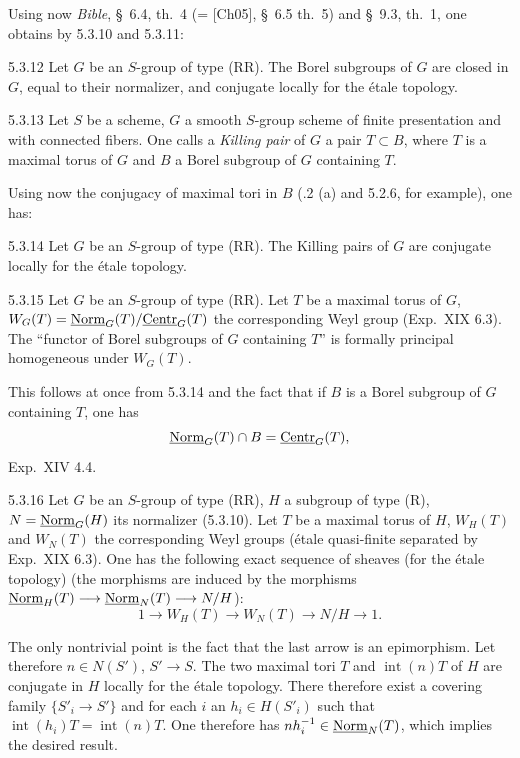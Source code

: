 Using now \textit{Bible}, \S~6.4, th.~4 (= [Ch05], \S~6.5 th.~5) and \S~9.3, th.~1, one obtains by 5.3.10 and 5.3.11:
\begin{corollary}{5.3.12}\label{XXII.5.3.12}
Let $G$ be an $S$-group of type (RR). The Borel subgroups of $G$ are closed in $G$, equal to their normalizer, and conjugate locally for the \'etale topology.
\end{corollary}
\begin{definition}{5.3.13}\label{XXII.5.3.13}
Let $S$ be a scheme, $G$ a smooth $S$-group scheme of finite presentation and with connected fibers.{\renewcommand{\thefootnote}{(34)}} One calls a \emph{Killing pair} of $G$ a pair $T\subset B$, where $T$ is a maximal torus of $G$ and $B$ a Borel subgroup of $G$ containing $T$.
\end{definition}
Using now the conjugacy of maximal tori in $B$ (.2 (a) and 5.2.6, for example), one has:
\begin{corollary}{5.3.14}\label{XXII.5.3.14}
Let $G$ be an $S$-group of type (RR). The Killing pairs of $G$ are conjugate locally for the \'etale topology.
\end{corollary}
\begin{corollary}{5.3.15}\label{XXII.5.3.15}
Let $G$ be an $S$-group of type (RR). Let $T$ be a maximal torus of $G$, $W_G(T)=\underline{\mathrm{Norm}}_G(T)/\underline{\mathrm{Centr}}_G(T)$ the corresponding Weyl group (Exp.~XIX 6.3). The ``functor of Borel subgroups of $G$ containing $T$'' is formally principal homogeneous under $W_G(T)$.
\end{corollary}
This follows at once from 5.3.14 and the fact that if $B$ is a Borel subgroup of $G$ containing $T$, one has
\[
\underline{\mathrm{Norm}}_G(T)\cap B=\underline{\mathrm{Centr}}_G(T),
\]
\cf Exp.~XIV 4.4.
\begin{proposition}{5.3.16}\label{XXII.5.3.16}
Let $G$ be an $S$-group of type (RR), $H$ a subgroup of type (R), $N=\underline{\mathrm{Norm}}_G(H)$ its normalizer (5.3.10). Let $T$ be a maximal torus of $H$, $W_H(T)$ and $W_N(T)$ the corresponding Weyl groups (\'etale quasi-finite separated by Exp.~XIX 6.3). One has the following exact sequence of sheaves (for the \'etale topology) (the morphisms are induced by the morphisms $\underline{\mathrm{Norm}}_H(T)\longrightarrow\underline{\mathrm{Norm}}_N(T)\longrightarrow N/H$):
\[
1\to W_H(T)\to W_N(T)\to N/H\to1.
\]
\end{proposition}
The only nontrivial point is the fact that the last arrow is an epimorphism. Let therefore $n\in N(S')$, $S'\to S$. The two maximal tori $T$ and $\operatorname{int}(n)T$ of $H$ are conjugate in $H$ locally for the \'etale topology. There therefore exist a covering family $\{S'_i\to S'\}$ and for each $i$ an $h_i\in H(S'_i)$ such that $\operatorname{int}(h_i)T=\operatorname{int}(n)T$. One therefore has $nh_i^{-1}\in\underline{\mathrm{Norm}}_N(T)$, which implies the desired result.
